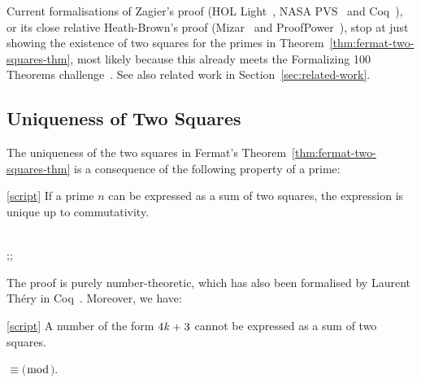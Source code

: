 \documentclass[sigplan,screen]{acmart}
\newcommand\urlpre{https://bitbucket.org/jhlchan/project/src/aed43871448e/fermat/twosq/}
\newcommand{\script}[3][script]{\href{\urlpre#2Script.sml\#lines-#3}{[#1]}} %
\newcommand{\script}[3][script]{\textit{[script]}} %
\newcommand{\m}[1]{\todo[fancyline,color=blue!40,size=\scriptsize]{\textsf{JC: #1}}} %
\renewcommand{\HOLinline}[1]{\ensuremath{#1}} %
\renewcommand{\HOLConst}[1]{{\fontsize{9pt}{1em}\selectfont\textsf{\upshape #1}}}
\renewcommand{\HOLNumLit}[1]{{\selectfont\textrm{\upshape #1}}} %
\renewcommand{\HOLSymConst}[1]{{\fontsize{9pt}{1em}\selectfont\textsf{\upshape #1}}}
\begin{document}
\noindent
Current formalisations of Zagier's proof (HOL Light~\cite{Harrison-2010}, NASA PVS~\cite{Narkawicz-2012-acm} and Coq~\cite{Dubach-Muehlboeck-2021-acm}), or its close relative Heath-Brown's proof (Mizar~\cite{Riccardi-2009} and ProofPower~\cite{Arthan-2016}), stop at just showing the existence of two squares for the primes in  Theorem~\ref{thm:fermat-two-squares-thm},
most likely because this already meets the Formalizing 100 Theorems challenge~\cite{Wiedijk-2020}.
See also related work in Section~\ref{sec:related-work}.

\subsection{Uniqueness of Two Squares}
\label{sec:uniqueness}
The uniqueness of the two squares in Fermat's Theorem~\ref{thm:fermat-two-squares-thm}
is a consequence of the following property of a prime:
\begin{theorem}
\label{thm:fermat-two-squares-unique}
\script{twoSquares}{205}
If a prime $n$ can be expressed as a sum of two squares, the expression is unique up to commutativity.
\begin{HOLmath}
\HOLTokenTurnstile{}\HOLConst{prime}\;\;\HOLSymConst{\HOLTokenConj{}}\;\;\HOLSymConst{=}\;\HOLFreeVar{a}\HOLSymConst{\ensuremath{\sp{2}}}\;\HOLSymConst{\ensuremath{+}}\;\HOLFreeVar{b}\HOLSymConst{\ensuremath{\sp{2}}}\;\HOLSymConst{\HOLTokenConj{}}\;\;\HOLSymConst{=}\;\HOLFreeVar{c}\HOLSymConst{\ensuremath{\sp{2}}}\;\HOLSymConst{\ensuremath{+}}\;\HOLFreeVar{d}\HOLSymConst{\ensuremath{\sp{2}}}\;\HOLSymConst{\HOLTokenImp{}}\\
\;\;\;\;\;\;\;\HOLTokenLeftbrace{};\;\HOLTokenRightbrace{}\;\HOLSymConst{=}\;\HOLTokenLeftbrace{};\;\HOLTokenRightbrace{}
\end{HOLmath}
\end{theorem}
\noindent
The proof is purely number-theoretic, which has also been formalised by Laurent Th{\'e}ry in Coq~\cite{Thery-2004}.
Moreover, we have:
\begin{theorem}
\label{thm:mod-4-not-squares}
\script{helperTwosq}{419}
A number of the form \HOLinline{\HOLNumLit{4}\HOLSymConst{\ensuremath{}}\HOLFreeVar{k}\;\HOLSymConst{\ensuremath{+}}\;\HOLNumLit{3}} cannot be expressed as a sum of two squares.
\begin{HOLmath}
\HOLTokenTurnstile{}\;\ensuremath{\equiv}\;\HOLNumLit{3}\;\ensuremath{(}\ensuremath{\bmod}\;\HOLNumLit{4}\ensuremath{)}\;\HOLSymConst{\HOLTokenImp{}}\;\HOLSymConst{\HOLTokenForall{}}\;.\;\;\HOLSymConst{\HOLTokenNotEqual{}}\;\HOLBoundVar{u}\HOLSymConst{\ensuremath{\sp{2}}}\;\HOLSymConst{\ensuremath{+}}\;\HOLBoundVar{v}\HOLSymConst{\ensuremath{\sp{2}}}
\end{HOLmath}
\end{theorem}
\end{document}
